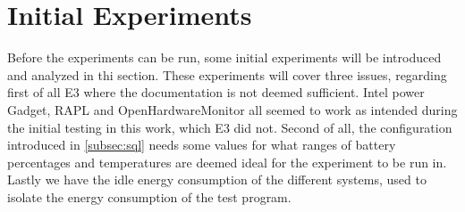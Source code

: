 \section{Initial Experiments}

Before the experiments can be run, some initial experiments will be introduced and analyzed in thi section. These experiments will cover three issues, regarding first of all E3 where the documentation is not deemed sufficient. Intel power Gadget, RAPL and OpenHardwareMonitor all seemed to work as intended during the initial testing in this work, which E3 did not. Second of all, the configuration introduced in \cref{subsec:sql} needs some values for what ranges of battery percentages and temperatures are deemed ideal for the experiment to be run in. Lastly we have the idle energy consumption of the different systems, used to isolate the energy consumption of the test program. 



